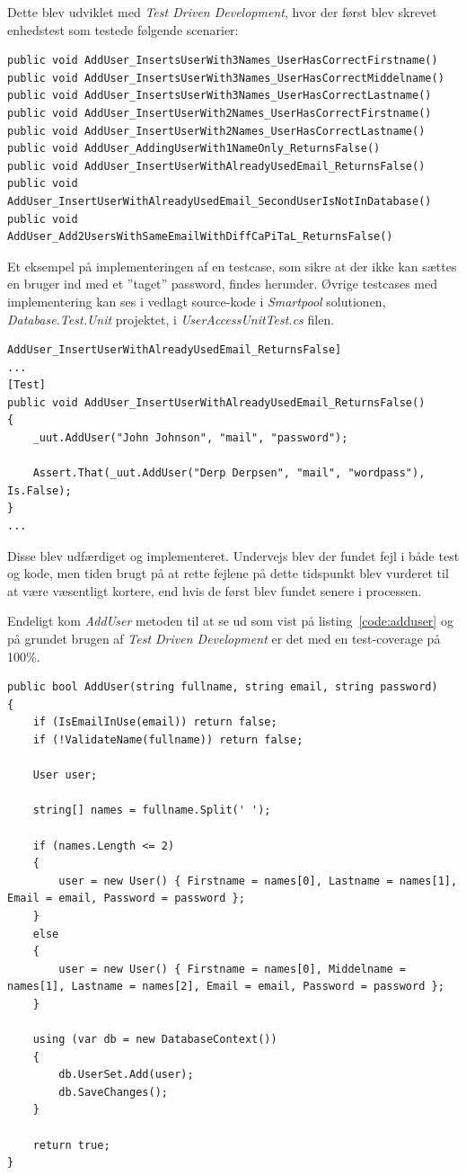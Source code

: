 Dette blev udviklet med \textit{Test Driven Development}, hvor der først blev skrevet enhedstest som testede følgende scenarier: 

\begin{lstlisting}[caption=Testcases til \textit{AddUser} metoden.,label=code:addusertestcases]
public void AddUser_InsertsUserWith3Names_UserHasCorrectFirstname()
public void AddUser_InsertsUserWith3Names_UserHasCorrectMiddelname()
public void AddUser_InsertsUserWith3Names_UserHasCorrectLastname()
public void AddUser_InsertUserWith2Names_UserHasCorrectFirstname()
public void AddUser_InsertUserWith2Names_UserHasCorrectLastname()
public void AddUser_AddingUserWith1NameOnly_ReturnsFalse()
public void AddUser_InsertUserWithAlreadyUsedEmail_ReturnsFalse()
public void AddUser_InsertUserWithAlreadyUsedEmail_SecondUserIsNotInDatabase()
public void AddUser_Add2UsersWithSameEmailWithDiffCaPiTaL_ReturnsFalse()
\end{lstlisting}

Et eksempel på implementeringen af en testcase, som sikre at der ikke kan sættes en bruger ind med et ''taget'' password, findes herunder. Øvrige testcases med implementering kan ses i vedlagt source-kode i \textit{Smartpool} solutionen, \textit{Database.Test.Unit} projektet, i \textit{UserAccessUnitTest.cs} filen.

\begin{lstlisting}[caption=Test for metoden] AddUser_InsertUserWithAlreadyUsedEmail_ReturnsFalse]
...
[Test]
public void AddUser_InsertUserWithAlreadyUsedEmail_ReturnsFalse()
{
	_uut.AddUser("John Johnson", "mail", "password");
	
	Assert.That(_uut.AddUser("Derp Derpsen", "mail", "wordpass"), Is.False);
}
...
\end{lstlisting}

Disse blev udfærdiget og implementeret. Undervejs blev der fundet fejl i både test og kode, men tiden brugt på at rette fejlene på dette tidspunkt blev vurderet til at være væsentligt kortere, end hvis de først blev fundet senere i processen. 

Endeligt kom \textit{AddUser} metoden til at se ud som vist på listing~\ref{code:adduser} og på grundet brugen af \textit{Test Driven Development} er det med en test-coverage på 100\%.

\begin{lstlisting}[caption=\textit{AddUser} metoden,label=code:adduser]
public bool AddUser(string fullname, string email, string password)
{
	if (IsEmailInUse(email)) return false;
	if (!ValidateName(fullname)) return false;
	
	User user;
	
	string[] names = fullname.Split(' ');
	
	if (names.Length <= 2)
	{
		user = new User() { Firstname = names[0], Lastname = names[1], Email = email, Password = password };
	}
	else
	{
		user = new User() { Firstname = names[0], Middelname = names[1], Lastname = names[2], Email = email, Password = password };
	}
	
	using (var db = new DatabaseContext())
	{
		db.UserSet.Add(user);
		db.SaveChanges();
	}
	
	return true;
}
\end{lstlisting}

